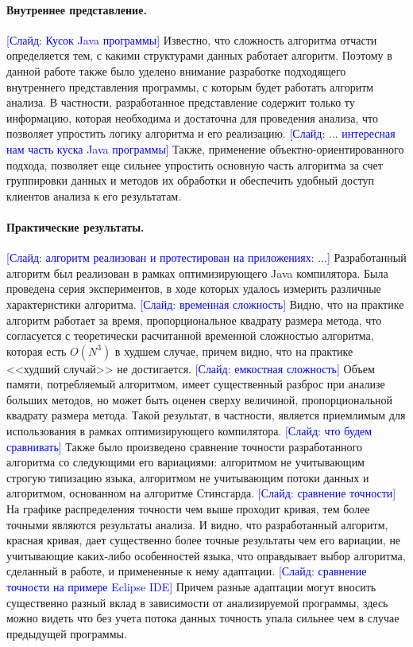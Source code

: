 \documentclass[12pt]{article}
\newcommand{\slide}[1]{\textcolor{Blue}{[Слайд: #1]}}
\begin{document}
  \paragraph{Внутреннее представление.}
  \slide{Кусок Java программы}
  Известно, что сложность алгоритма отчасти определяется тем, с какими
  структурами данных работает алгоритм. Поэтому в данной работе также было
  уделено внимание
  разработке подходящего внутреннего представления программы, с которым будет
  работать алгоритм анализа. В частности, разработанное представление содержит
  только ту информацию, которая необходима и достаточна для проведения анализа,
  что позволяет упростить логику алгоритма и его реализацию.
  \slide{... интересная нам часть куска Java программы}
  Также, применение объектно-ориентированного подхода, позволяет еще сильнее
  упростить основную часть алгоритма за счет группировки данных и методов их
  обработки и обеспечить удобный доступ клиентов анализа к его результатам.

  \paragraph{Практические результаты.}
  \slide{алгоритм реализован и протестирован на приложениях: ...}
  Разработанный алгоритм был реализован в рамках оптимизирующего Java
  компилятора. Была проведена серия экспериментов, в ходе которых удалось
  измерить различные характеристики алгоритма.
  \slide{временная сложность}
  Видно, что на практике алгоритм работает за время, пропорциональное
  квадрату размера метода, что согласуется с теоретически расчитанной
  временной сложностью алгоритма, которая есть $O(N^3)$ в худшем случае,
  причем видно, что на практике <<худший случай>> не достигается.
  \slide{емкостная сложность}
  Объем памяти, потребляемый алгоритмом, имеет существенный разброс при анализе
  больших методов, но может быть оценен сверху величиной, пропорциональной
  квадрату размера метода. Такой результат, в частности, является приемлимым
  для использования в рамках оптимизирующего компилятора.
  \slide{что будем сравнивать}
  Также было произведено сравнение точности разработанного алгоритма со
  следующими его вариациями: алгоритмом не учитывающим строгую типизацию языка,
  алгоритмом не учитывающим потоки данных и алгоритмом, основанном на алгоритме
  Стинсгарда.
  \slide{сравнение точности}
  На графике распределения точности чем выше проходит кривая, тем
  более точными являются результаты анализа. И видно, что разработанный
  алгоритм, красная кривая, дает существенно более точные результаты чем
  его вариации, не учитывающие каких-либо особенностей языка, что
  оправдывает выбор алгоритма, сделанный в работе, и примененные к нему
  адаптации.
  \slide{сравнение точности на примере Eclipse IDE}
  Причем разные адаптации могут вносить существенно разный вклад в зависимости
  от анализируемой программы, здесь можно видеть что без учета потока данных
  точность упала сильнее чем в случае предыдущей программы.
\end{document}
